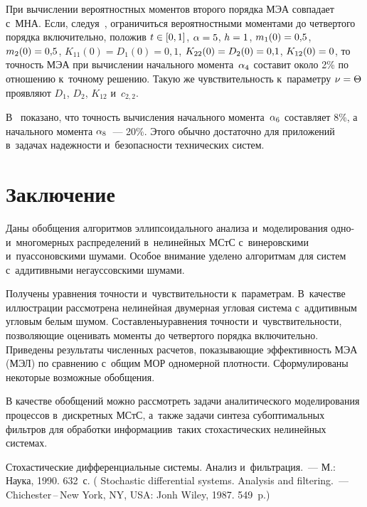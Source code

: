 \begin{multicols}{2}
При вычислении вероятностных моментов второго порядка МЭА совпадает с~МНА. 
Если, следуя~\cite{11-sin}, ограничиться вероятностными моментами до четвертого порядка 
включительно, положив $t\hm\in [0,1]$, $\alp\hm=5$, $h\hm=1$, $m_1 (0) \hm= 0{,}5$, 
$m_2(0)\hm= 0{,}5$, $K_{11}(0) = D_1(0)=0{,}1$, $K_{22} (0)\hm=D_2(0)=0{,}1$, 
$K_{12}(0)\hm=0$, то точность МЭА при вычислении начального момента~$\alpha_4$ составит 
около 2\% по отношению к~точному решению. Такую же чувствительность к~параметру  
$\nu \hm= \Theta$ проявляют  $D_1$, $D_2$, $K_{12}$ и~$c_{2,2}$.

В~\cite{11-sin} показано, что точность вычисления начального момента~$\alpha_6$ 
составляет  8\%, а начального момента $\alpha_8$~--- 20\%. Этого обычно достаточно 
для приложений в~задачах надежности и~безопасности технических систем.

\section{Заключение}


Даны обобщения алгоритмов эллипсоидального анализа и~моделирования одно- 
и~многомерных распределений в~нелинейных МСтС 
с~винеровскими и~пуассоновскими шумами. Особое
внимание уделено алгоритмам для систем с~аддитивными негауссовскими шумами.

Получены уравнения точности и~чувствительности к~параметрам. 
В~качестве иллюстрации рассмотрена нелинейная двумерная угловая система 
с~аддитивным угловым белым шумом. Составлены\linebreak уравнения точности и~чувствительности, 
позволяющие оценивать моменты до четвертого порядка включительно. Приведены результаты 
численных расчетов, показывающие эффективность МЭА (МЭЛ) по сравнению с~общим МОР
 одномерной плот\-ности. Сформулированы некоторые возможные 
обобщения.

В качестве обобщений можно рассмотреть задачи аналитического моделирования 
процессов в~дискретных МСтС, а~также задачи 
синтеза субоптимальных фильтров для обработки информации\linebreak в~таких стохастических 
нелинейных системах.


{\small\frenchspacing
 {%
 \begin{thebibliography}{99}

Стохастические дифференциальные системы. Анализ и~фильтрация.~--- М.:
Наука,  1990.  632~с. (
Stochastic differential systems.
Analysis and filtering.~--- Chichester\,--\,New York, NY, USA: Jonh Wiley, 1987.
549~p.)


\end{thebibliography}}}
\end{multicols}
